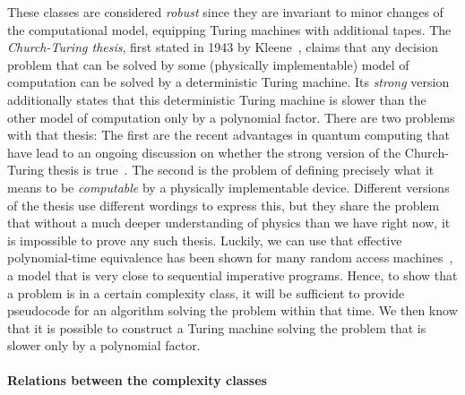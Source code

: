\documentclass[../../diss.tex]{subfiles}
\begin{document}
These classes are considered \emph{robust} since they are invariant to minor changes of the computational model, \eg equipping Turing machines with additional tapes.
The \emph{Church-Turing thesis}, first stated in 1943 by Kleene~\cite{Kleene43}, claims that any decision problem that can be solved by some (physically implementable) model of computation can be solved by a deterministic Turing machine.
Its \emph{strong} version additionally states that this deterministic Turing machine is slower than the other model of computation only by a polynomial factor.
There are two problems with that thesis:
The first are the recent advantages in quantum computing that have lead to an ongoing discussion on whether the strong version of the Church-Turing thesis is true~\cite{BernsteinV93,KayeLM07}.
The second is the problem of defining precisely what it means to be \emph{computable} by a physically implementable device.
Different versions of the thesis use different wordings to express this, but they share the problem that without a much deeper understanding of physics than we have right now, it is impossible to prove any such thesis.
Luckily, we can use that effective polynomial-time equivalence has been shown for many random access machines~\cite{CookR72}, a model that is very close to sequential imperative programs.
Hence, to show that a problem is in a certain complexity class, it will be sufficient to provide pseudocode for an algorithm solving the problem within that time.
We then know that it is possible to construct a Turing machine solving the problem that is slower only by a polynomial factor.

\paragraph{Relations between the complexity classes}
\end{document}
